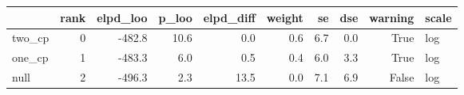 \begin{tabular}{lrrrrrrrrl}
\toprule
 & rank & elpd_loo & p_loo & elpd_diff & weight & se & dse & warning & scale \\
\midrule
two_cp & 0 & -482.8 & 10.6 & 0.0 & 0.6 & 6.7 & 0.0 & True & log \\
one_cp & 1 & -483.3 & 6.0 & 0.5 & 0.4 & 6.0 & 3.3 & True & log \\
null & 2 & -496.3 & 2.3 & 13.5 & 0.0 & 7.1 & 6.9 & False & log \\
\bottomrule
\end{tabular}
